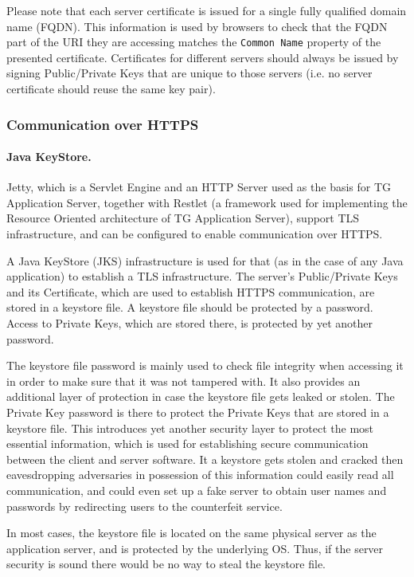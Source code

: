 \documentclass[a4paper,12pt,oneside,openright]{memoir}
\begin{document}
	Please note that each server certificate is issued for a single fully qualified domain name (FQDN).
	This information is used by browsers to check that the FQDN part of the URI they are accessing matches the \texttt{Common Name} property of the presented certificate.
	Certificates for different servers should always be issued by signing Public/Private Keys that are unique to those servers (i.e. no server certificate should reuse the same key pair).

\subsubsection*{Communication over HTTPS}

	\paragraph{Java KeyStore.}
	Jetty, which is a Servlet Engine and an HTTP Server used as the basis for TG Application Server, together with Restlet (a framework used for implementing the Resource Oriented architecture of TG Application Server), support TLS infrastructure, and can be configured to enable communication over HTTPS.

	A Java KeyStore (JKS) infrastructure is used for that (as in the case of any Java application) to establish a TLS infrastructure.
	The server's Public/Private Keys and its Certificate, which are used to establish HTTPS communication, are stored in a keystore file.
	A keystore file should be protected by a password. Access to Private Keys, which are stored there, is protected by yet another password.

	The keystore file password is mainly used to check file integrity when accessing it in order to make sure that it was not tampered with.
	It also provides an additional layer of protection in case the keystore file gets leaked or stolen.
	The Private Key password is there to protect the Private Keys that are stored in a keystore file.
	This introduces yet another security layer to protect the most essential information, which is used for establishing secure communication between the client and server software.
	It a keystore gets stolen and cracked then eavesdropping adversaries in possession of this information could easily read all communication, and could even set up a fake server to obtain user names and passwords by redirecting users to the counterfeit service.

	In most cases, the keystore file is located on the same physical server as the application server, and is protected by the underlying OS.
	Thus, if the server security is sound there would be no way to steal the keystore file.
\end{document}
